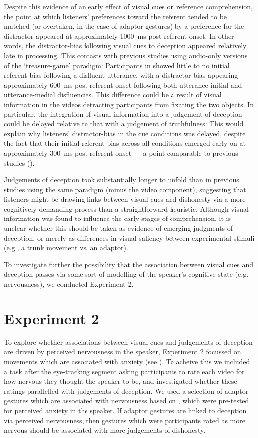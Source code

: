 \documentclass[a4paper,man,natbib]{apa6}
\begin{document}
Despite this evidence of an early effect of visual cues on reference comprehension, the point at which listeners' preferences toward the referent tended to be matched (or overtaken, in the case of adaptor gestures) by a preference for the distractor appeared at approximately 1000~ms post-referent onset. 
In other words, the distractor-bias following visual cues to deception appeared relatively late in processing.
This contasts with previous studies using audio-only versions of the `treasure-game' paradigm: Participants in \citet{Loy2017} showed little to no initial referent-bias following a disfluent utterance, with a distractor-bias appearing approximately 600~ms post-referent onset following both utterance-initial and utterance-medial disfluencies. 
This difference could be a result of visual information in the videos detracting participants from fixating the two objects. 
In particular, the integration of visual information into a judgement of deception could be delayed relative to that with a judgement of truthfulness: 
This would explain why listeners' distractor-bias in the cue conditions was delayed, despite the fact that their initial referent-bias across all conditions emerged early on at approximately 300~ms post-referent onset --- a point comparable to previous studies (\citealt{Loy2017, King2018}). 

Judgements of deception took substantially longer to unfold than in previous studies using the same paradigm (minus the video component), suggesting that listeners might be drawing links between visual cues and dishonesty via a more cognitively demanding process than a straightforward heuristic.
Although visual information was found to influence the early stages of comprehension, it is unclear whether this should be taken as evidence of emerging judgments of deception, or merely as differences in visual saliency between experimental stimuli (e.g., a trunk movement vs. an adaptor).

To investigate further the possibility that the association between visual cues and deception passes via some sort of modelling of the speaker's cognitive state (e.g. nervousness), we conducted Experiment 2.

\section{Experiment 2}
To explore whether associations between visual cues and judgements of deception are driven by perceived nervousness in the speaker, Experiment 2 focussed on movements which are associated with anxiety (see \citet{Gregersen2005}).
To acheive this we included a task after the eye-tracking segment asking participants to rate each video for how nervous they thought the speaker to be, and investigated whether these ratings parallelled with judgements of deception.
We used a selection of adaptor gestures which are associated with nervousness based on \citet{Gregersen2005}, which were pre-tested for perceived anxiety in the speaker. 
If adaptor gestures are linked to deception via perceived nervousness, then gestures which were participants rated as more nervous should be associated with more judgements of dishonesty. 
\end{document}
